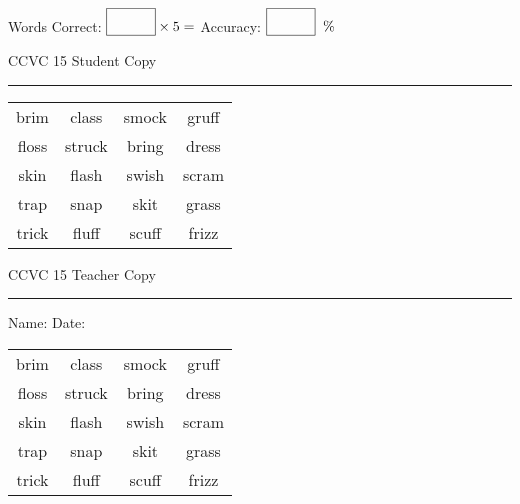 \documentclass{memoir}
\begin{document}
\normalsize

Words Correct: $\fbox{\phantom{\huge 100}} \times 5 = $ Accuracy: $\fbox{\phantom{\huge 100}}\;\; \%$ 

\vfill

\newpage


\footnotesize \noindent
CCVC 15 \hfill Student Copy
\smallskip
\hrule

\Large

\setlength{\tabcolsep}{14pt}
\def\arraystretch{3}

{\selectfont


\begin{vplace}[0.5]
\begin{center}
\begin{tabular}{cccc}
brim      & class             & smock & gruff \\
floss & struck & bring      & dress \\
skin & flash             & swish & scram \\
trap & snap & skit & grass                    \\
trick & fluff & scuff & frizz \\
\end{tabular}
\end{center}
\end{vplace}

}

\newpage

\footnotesize \noindent
CCVC 15 \hfill Teacher Copy
\smallskip
\hrule

\normalsize

\vfill

\noindent
Name: \underline{\hspace{1.75in}} \hfill Date: \underline{\hspace{1in}}

\Large

{\selectfont


\begin{vplace}[0.5]
\begin{center}
\begin{tabular}{cccc}
brim      & class             & smock & gruff \\
floss & struck & bring      & dress \\
skin & flash             & swish & scram \\
trap & snap & skit & grass                    \\
trick & fluff & scuff & frizz \\
\end{tabular}
\end{center}
\end{vplace}



}
\end{document}
